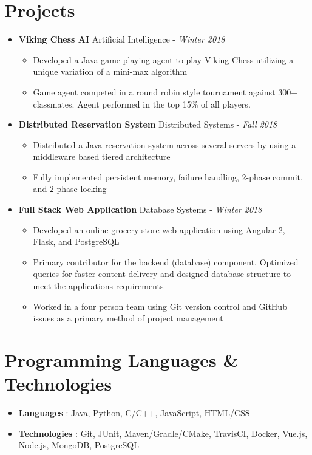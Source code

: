 \documentclass[letterpaper,11pt]{article}
\newcommand{\resumeItem}[2]{
  \item\small{
    \textbf{#1}{ #2 \vspace{-2pt}}
  }
}
\newcommand{\resumeSubItem}[2]{\resumeItem{#1}{#2}\vspace{-2pt}}
\newcommand{\resumeSubHeadingListStart}{\begin{itemize}[leftmargin=*] \vspace{.1cm}}
\newcommand{\resumeSubHeadingListEnd}{\end{itemize}}
\begin{document}
\section{Projects}
  \resumeSubHeadingListStart
	\resumeSubItem{Viking Chess AI}{\hspace*{\fill}Artificial Intelligence - \textit{Winter 2018}}
	\resumeSubHeadingListStart
		\resumeItem{}{Developed a Java game playing agent to play Viking Chess utilizing a unique variation of a mini-max algorithm}
		\resumeItem{}{Game agent competed in a round robin style tournament against 300+ classmates. Agent performed in the top 15\% of all players.}
	\resumeSubHeadingListEnd
	\resumeSubItem{Distributed Reservation System}{\hspace*{\fill}Distributed Systems - \textit{Fall 2018}}
	\resumeSubHeadingListStart
		\resumeItem{}{Distributed a Java reservation system across several servers by using a middleware based tiered architecture}
		\resumeItem{}{Fully implemented persistent memory, failure handling, 2-phase commit, and 2-phase locking}
	\resumeSubHeadingListEnd
	\resumeSubItem{Full Stack Web Application}{\hspace*{\fill}Database Systems - \textit{Winter 2018}}
	\resumeSubHeadingListStart
		\resumeItem{}{Developed an online grocery store web application using Angular 2, Flask, and PostgreSQL}
		\resumeItem{}{Primary contributor for the backend (database) component. Optimized queries for faster content delivery and designed database structure to meet the applications requirements}
		\resumeItem{}{Worked in a four person team using Git version control and GitHub issues as a primary method of project management}
	\resumeSubHeadingListEnd
  \resumeSubHeadingListEnd


\section{Programming Languages \& Technologies}
  \resumeSubHeadingListStart
    \resumeItem{
      \textbf{Languages}}{: Java, Python, C/C++, JavaScript, HTML/CSS}
      
    \resumeItem{
	\textbf{Technologies}}{: Git, JUnit, Maven/Gradle/CMake, TravisCI, Docker, Vue.js, Node.js, MongoDB, PostgreSQL}
	
  \resumeSubHeadingListEnd

\end{document}
